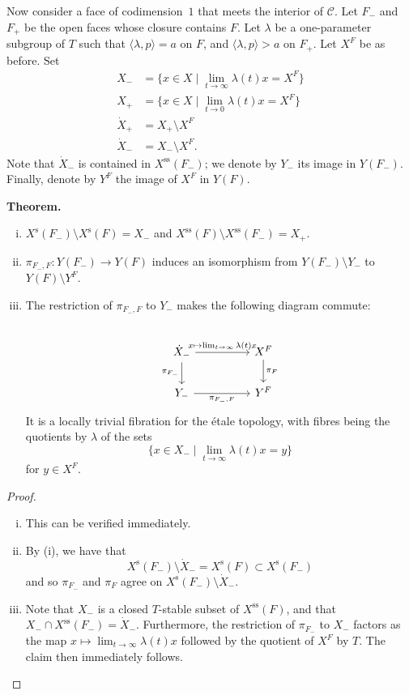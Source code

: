 \documentclass{article}
\newenvironment{itenv}[1]
  {\phantomsection\par\medskip\noindent\textbf{#1.}\itshape}
  {\medskip}
\newcommand{\s}{\mathrm{s}}
\renewcommand{\ss}{\mathrm{ss}}
\newcommand{\oldpage}[1]{\marginpar{\footnotesize$\Big\vert$ \textit{p.~#1}}}
\begin{document}
Now consider a face of codimension~$1$ that meets the interior of $\mathcal{C}$.
Let $F_-$ and $F_+$ be the open faces whose closure contains $F$.
Let $\lambda$ be a one-parameter subgroup of $T$ such that $\langle\lambda,p\rangle=a$ on $F$, and $\langle\lambda,p\rangle>a$ on $F_+$.
Let $X^F$ be as before.
Set
\[
  \begin{aligned}
    X_- &= \big\{x\in X\mid\lim_{t\to\infty}\lambda(t)x=X^F\big\}
  \\X_+ &= \big\{x\in X\mid\lim_{t\to0}\lambda(t)x=X^F\big\}
  \\\dot{X}_+ &= X_+\setminus X^F
  \\\dot{X}_- &= X_-\setminus X^F.
  \end{aligned}
\]
Note that $\dot{X}_-$ is contained in $X^\ss(F_-)$;
we denote by $Y_-$ its image in $Y(F_-)$.
Finally, denote by $Y^F$ the image of $X^F$ in $Y(F)$.

\oldpage{517}
\begin{itenv}{Theorem}
  \begin{enumerate}[(i)]
    \item $X^\s(F_-)\setminus X^\s(F)=X_-$ and $X^\ss(F)\setminus X^\ss(F_-)=X_+$.
    \item $\pi_{F_-,F}\colon Y(F_-)\to Y(F)$ induces an isomorphism from $Y(F_-)\setminus Y_-$ to $Y(F)\setminus Y^F$.
    \item The restriction of $\pi_{F_-,F}$ to $Y_-$ makes the following diagram commute:
      \[
        \begin{tikzcd}[column sep=huge]
        \\\dot{X}_- \rar["x\mapsto\lim_{t\to\infty}\lambda(t)x"] \dar[swap,"\pi_{F_-}"]
          & X^F \dar["\pi_F"]
        \\Y_- \rar[swap,"\pi_{F_-,F}"]
          & Y^F
        \end{tikzcd}
      \]
      It is a locally trivial fibration for the \'{e}tale topology, with fibres being the quotients by $\lambda$ of the sets
      \[
        \big\{x\in X_-\mid\lim_{t\to\infty}\lambda(t)x=y\big\}
      \]
      for $y\in X^F$.
  \end{enumerate}
\end{itenv}

\begin{proof}
  \begin{enumerate}[(i)]
    \item This can be verified immediately.
    \item By (i), we have that
      \[
        X^\s(F_-)\setminus\dot{X}_- = X^\s(F) \subset X^\s(F_-)
      \]
      and so $\pi_{F_-}$ and $\pi_F$ agree on $X^\s(F_-)\setminus\dot{X}_-$.
    \item Note that $X_-$ is a closed $T$-stable subset of $X^\ss(F)$, and that $X_-\cap X^\ss(F_-)=\dot{X}_-$.
      Furthermore, the restriction of $\pi_{F_-}$ to $X_-$ factors as the map $x\mapsto\lim_{t\to\infty}\lambda(t)x$ followed by the quotient of $X^F$ by $T$.
      The claim then immediately follows.
  \end{enumerate}
\end{proof}
\end{document}
